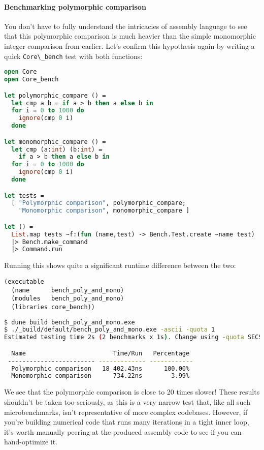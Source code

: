 \hypertarget{benchmarking-polymorphic-comparison}{%
\paragraph{Benchmarking polymorphic
comparison}\label{benchmarking-polymorphic-comparison}}

You don't have to fully understand the intricacies of assembly language
to see that this polymorphic comparison is much heavier than the simple
monomorphic integer comparison from earlier. Let's confirm this
hypothesis again by writing a quick
\passthrough{\lstinline!Core\_bench!} test with both functions:

\begin{lstlisting}[language=Caml]
open Core
open Core_bench

let polymorphic_compare () =
  let cmp a b = if a > b then a else b in
  for i = 0 to 1000 do
    ignore(cmp 0 i)
  done

let monomorphic_compare () =
  let cmp (a:int) (b:int) =
    if a > b then a else b in
  for i = 0 to 1000 do
    ignore(cmp 0 i)
  done

let tests =
  [ "Polymorphic comparison", polymorphic_compare;
    "Monomorphic comparison", monomorphic_compare ]

let () =
  List.map tests ~f:(fun (name,test) -> Bench.Test.create ~name test)
  |> Bench.make_command
  |> Command.run
\end{lstlisting}

Running this shows quite a significant runtime difference between the
two:

\begin{lstlisting}
(executable
  (name      bench_poly_and_mono)
  (modules   bench_poly_and_mono)
  (libraries core_bench))
\end{lstlisting}

\begin{lstlisting}[language=bash]
$ dune build bench_poly_and_mono.exe
$ ./_build/default/bench_poly_and_mono.exe -ascii -quota 1
Estimated testing time 2s (2 benchmarks x 1s). Change using -quota SECS.

  Name                        Time/Run   Percentage
 ------------------------ ------------- ------------
  Polymorphic comparison   18_402.43ns      100.00%
  Monomorphic comparison      734.22ns        3.99%
\end{lstlisting}

We see that the polymorphic comparison is close to 20 times slower!
These results shouldn't be taken too seriously, as this is a very narrow
test that, like all such microbenchmarks, isn't representative of more
complex codebases. However, if you're building numerical code that runs
many iterations in a tight inner loop, it's worth manually peering at
the produced assembly code to see if you can hand-optimize it.

